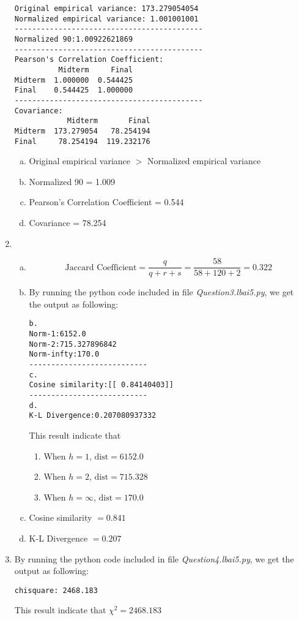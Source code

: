 \documentclass[11pt]{article}
\begin{document}
\begin{enumerate}
		\begin{lstlisting}
Original empirical variance: 173.279054054
Normalized empirical variance: 1.001001001
-------------------------------------------
Normalized 90:1.00922621869
-------------------------------------------
Pearson's Correlation Coefficient:
          Midterm     Final
Midterm  1.000000  0.544425
Final    0.544425  1.000000
-------------------------------------------
Covariance:
            Midterm       Final
Midterm  173.279054   78.254194
Final     78.254194  119.232176
		\end{lstlisting}
		\begin{enumerate}[a.]
			\item Original empirical variance $>$ Normalized empirical variance
			\item Normalized 90 = 1.009
			\item Pearson's Correlation Coefficient = 0.544
			\item Covariance = 78.254
		\end{enumerate}
		\item 
		\begin{enumerate}[a.]
			\item \[\text{Jaccard Coefficient} = \frac{q}{q + r + s} = \frac{58}{58 + 120 + 2} = 0.322
 \]
			\item By running the python code included in file \textit{Question3.lbai5.py}, we get the output as following:
			\begin{lstlisting}
b.
Norm-1:6152.0
Norm-2:715.327896842
Norm-infty:170.0
---------------------------
c.
Cosine similarity:[[ 0.84140403]]
---------------------------
d.
K-L Divergence:0.207080937332
			\end{lstlisting}
	This result indicate that
				\begin{enumerate}[1.]
					\item When $h = 1$, $\text{dist} = 6152.0$
					\item When $h = 2$, $\text{dist} = 715.328$
					\item When $h = \infty$, $\text{dist} = 170.0$
				\end{enumerate}
				\item Cosine similarity $ = 0.841$
				\item K-L Divergence $ = 0.207$
		\end{enumerate}
		
		\item By running the python code included in file \textit{Question4.lbai5.py}, we get the output as following:
\begin{lstlisting}
chisquare: 2468.183
\end{lstlisting}
	This result indicate that $\chi^2 = 2468.183$
	\end{enumerate}
\end{document}
